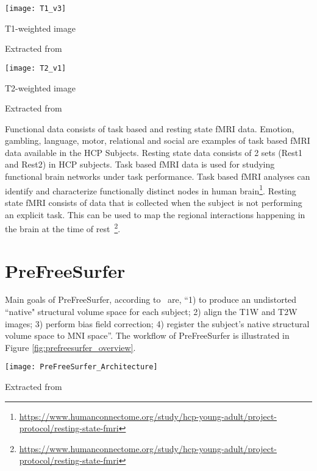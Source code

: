 \begin{center}
  \texttt{[image: T1\_v3]}
  \caption{T1-weighted image}
  \label{fig:T1w}
  \caption*{Extracted from \cite{t1w_t2w}}
\end{center}

\begin{center}
  \texttt{[image: T2\_v1]}
  \caption{T2-weighted image}
  \label{fig:T2w}
  \caption*{Extracted from \cite{t1w_t2w}}
\end{center}

\indent Functional data consists of task based and resting state fMRI 
data. Emotion, gambling, language, motor, relational and social are 
examples of task based fMRI data available in the HCP Subjects. Resting 
state data consists of 2 sets (Rest1 and Rest2) in HCP subjects. Task 
based fMRI data is used for studying functional brain networks under 
task performance. Task based fMRI analyses can identify and 
characterize functionally distinct nodes in human 
brain\footnote{\url{https://www.humanconnectome.org/study/hcp-young-adult/project-protocol/resting-state-fmri}}. 
Resting state fMRI consists of data that is collected when the subject 
is not performing an explicit task. This can be used to map the 
regional interactions happening in the brain at the time of 
rest~\footnote{\url{https://www.humanconnectome.org/study/hcp-young-adult/project-protocol/resting-state-fmri}}.


\section{PreFreeSurfer} \label{sec:PrefreeSurfer}
Main goals of PreFreeSurfer, according to~\cite{Gla13} are, ``1) to produce an undistorted ``native" structural volume space for each subject; 2) align the T1W and T2W images; 3) perform bias field correction; 4) register the subject's native structural volume space to MNI space''. The workflow of PreFreeSurfer is illustrated in Figure \ref{fig:prefreesurfer_overview}.

\begin{center}
  \texttt{[image: PreFreeSurfer\_Architecture]}
  \label{fig:prefreesurfer_overview}
  \caption*{Extracted from \cite{Gla13}}
\end{center}

